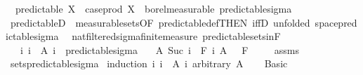 \begin{isabellebody}
\ \ {\isachardoublequoteopen}predictable\ X\ {\isacharequal}{\kern0pt}\ {\isacharparenleft}{\kern0pt}case{\isacharunderscore}{\kern0pt}prod\ X\ {\isasymin}\ borel{\isacharunderscore}{\kern0pt}measurable\ {\isacharparenleft}{\kern0pt}predictable{\isacharunderscore}{\kern0pt}sigma{\isacharparenright}{\kern0pt}{\isacharparenright}{\kern0pt}{\isachardoublequoteclose}\isanewline
\isanewline
{}\isamarkupfalse%
\ predictableD\ {\isacharequal}{\kern0pt}\ measurable{\isacharunderscore}{\kern0pt}sets{\isacharbrackleft}{\kern0pt}OF\ predictable{\isacharunderscore}{\kern0pt}def{\isacharbrackleft}{\kern0pt}THEN\ iffD{}{\isacharbrackright}{\kern0pt}{\isacharcomma}{\kern0pt}\ unfolded\ space{\isacharunderscore}{\kern0pt}predictable{\isacharunderscore}{\kern0pt}sigma{\isacharbrackright}{\kern0pt}\isanewline
\isanewline
{}\isamarkupfalse%
\ {\isacharparenleft}{\kern0pt}\ nat{\isacharunderscore}{\kern0pt}filtered{\isacharunderscore}{\kern0pt}sigma{\isacharunderscore}{\kern0pt}finite{\isacharunderscore}{\kern0pt}measure{\isacharparenright}{\kern0pt}\ predictable{\isacharunderscore}{\kern0pt}sets{\isacharunderscore}{\kern0pt}in{\isacharunderscore}{\kern0pt}F{\isacharcolon}{\kern0pt}\isanewline
\ \ \ {\isachardoublequoteopen}{\isacharparenleft}{\kern0pt}{\isasymUnion}i{\isachardot}{\kern0pt}\ {\isacharbraceleft}{\kern0pt}i{\isacharbraceright}{\kern0pt}\ {\isasymtimes}\ A\ i{\isacharparenright}{\kern0pt}\ {\isasymin}\ predictable{\isacharunderscore}{\kern0pt}sigma{\isachardoublequoteclose}\isanewline
\ \ \ {\isachardoublequoteopen}A\ {\isacharparenleft}{\kern0pt}Suc\ i{\isacharparenright}{\kern0pt}\ {\isasymin}\ F\ i{\isachardoublequoteclose}\ {\isachardoublequoteopen}A\ {}\ {\isasymin}\ F\ {}{\isachardoublequoteclose}\isanewline
%
\isadelimproof
\ \ %
\endisadelimproof
%
\isatagproof
{}\isamarkupfalse%
\ assms\ \isamarkupfalse%
\ sets{\isacharunderscore}{\kern0pt}predictable{\isacharunderscore}{\kern0pt}sigma\isanewline
{}\isamarkupfalse%
\ {\isacharparenleft}{\kern0pt}induction\ {\isachardoublequoteopen}{\isacharparenleft}{\kern0pt}{\isasymUnion}i{\isachardot}{\kern0pt}\ {\isacharbraceleft}{\kern0pt}i{\isacharbraceright}{\kern0pt}\ {\isasymtimes}\ A\ i{\isacharparenright}{\kern0pt}{\isachardoublequoteclose}\ arbitrary{\isacharcolon}{\kern0pt}\ A{\isacharparenright}{\kern0pt}\isanewline
\ \ \isamarkupfalse%
\ Basic\isanewline
\ \ \isacommand{{\isacharbraceleft}{\kern0pt}}\isamarkupfalse%

\end{isabellebody}
